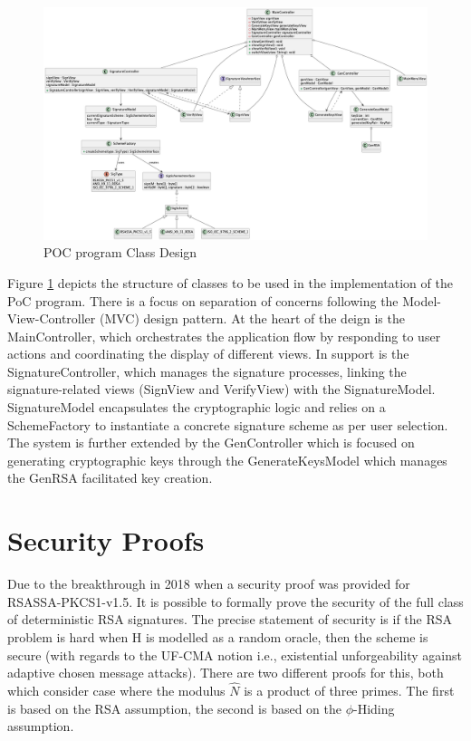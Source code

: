 \documentclass[]{final_report}
\theoremstyle{definition}
\begin{document}
\begin{landscape}
\thispagestyle{lscape} %
\begin{figure}[H]
    \centering
    \includegraphics[width=21.7cm]{POC.png}
    \caption{POC program Class Design}
    \label{fig:POCCLASSES}
\end{figure}
\end{landscape}
Figure \ref{fig:POCCLASSES} depicts the structure of classes to be used in the implementation of the PoC program.  There is a focus on separation of concerns following the Model-View-Controller (MVC) design pattern. At the heart of the deign is the MainController, which orchestrates the application flow by responding to user actions and coordinating the display of different views. In support is the SignatureController, which manages the signature processes, linking the signature-related views (SignView and VerifyView) with the SignatureModel. SignatureModel encapsulates the cryptographic logic and relies on a SchemeFactory to instantiate a concrete signature scheme as per user selection. The system is further extended by the GenController which is focused on generating cryptographic keys through the GenerateKeysModel which manages the GenRSA facilitated key creation.




\chapter{Security Proofs}
Due to the breakthrough in 2018 when a security proof \cite{jager2018security}  was provided for RSASSA-PKCS1-v1.5. It is possible to formally prove the security of the full class of deterministic RSA signatures. The precise statement of security is if the RSA problem is hard when H is modelled as a random oracle, then the scheme is secure (with regards to the UF-CMA notion i.e.,  existential unforgeability against adaptive chosen message attacks). There are two different proofs for this, both which consider case where the modulus $\widehat{N}$ is a product of three primes. The first is based on the RSA assumption, the second is based on the $\phi$-Hiding assumption.
\end{document}
